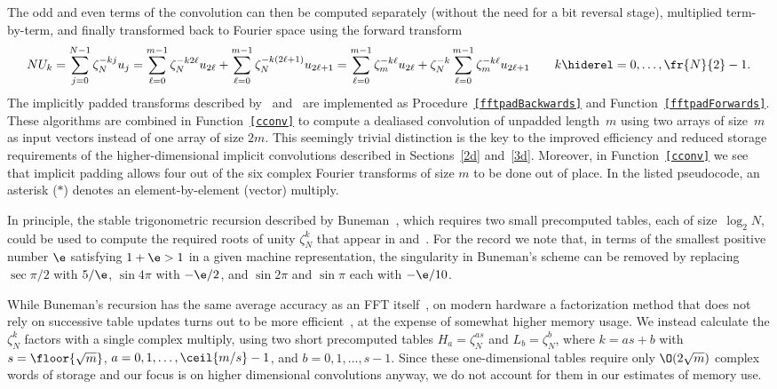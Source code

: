 \documentclass[final]{siamltex}
\def\bel{\begin{dmath}}
\def\eel{\end{dmath}}
\def\no{\hiderel}
\begin{document}
The odd and even terms of the convolution can then be computed separately
(without the need for a bit reversal stage), multiplied term-by-term, and
finally transformed back to Fourier space using the forward transform
\bel
NU_k=\sum_{j=0}^{N-1}\zeta_N^{-kj} u_j
=\sum_{\ell=0}^{m-1}\zeta_N^{-k2\ell} u_{2\ell}
+\sum_{\ell=0}^{m-1}\zeta_N^{-k(2\ell+1)} u_{2\ell+1}
=\sum_{\ell=0}^{m-1}\zeta_m^{-k\ell} u_{2\ell}
+\zeta_N^{-k}\sum_{\ell=0}^{m-1}\zeta_m^{-k\ell} u_{2\ell+1}
\qquad k\no=0,\ldots,\fr{N}{2}-1.\label{cconv1forwards}
\eel
The implicitly padded transforms described by~
and~ are implemented as
Procedure~{\tt\ref{fftpadBackwards}} and Function~{\tt\ref{fftpadForwards}}.
These algorithms are combined in Function~{\tt\ref{cconv}} to 
compute a dealiased convolution of unpadded length~$m$ using
two arrays of size~$m$ as input vectors instead of one array of size $2m$.
This seemingly trivial distinction is the key to the improved efficiency
and reduced storage requirements of the higher-dimensional implicit
convolutions described in Sections~\ref{2d} and~\ref{3d}.
Moreover, in Function~{\tt\ref{cconv}} we see that implicit padding allows four
out of the six complex Fourier transforms of size $m$ to be done out of place.
In the listed pseudocode, an asterisk ($*$) denotes an element-by-element
(vector) multiply.

In principle, the stable trigonometric recursion described by
Buneman~\cite{Buneman87}, which requires two small precomputed tables, each
of size~$\log_2 N$, could be used to compute the required roots of unity
$\zeta_N^k$ that appear in 
and~. For the
record we note that, in terms of the smallest positive number $\e$ 
satisfying $1+\e > 1$ in a given machine representation, the singularity in
Buneman's scheme can be removed by replacing $\sec{\pi/2}$ with  $5/\e$,
$\sin 4\pi$ with $-\e/2$, and $\sin{2\pi}$ and $\sin{\pi}$ each with $-\e/10$.

While Buneman's recursion has the same average accuracy as an FFT
itself~\cite{Tasche02}, on modern hardware a factorization method that does
not rely on successive table updates turns out to be more
efficient~\cite{Johnson09}, at the expense of somewhat higher memory usage.
We instead calculate the $\zeta_N^k$ factors with a single complex
multiply, using two short precomputed tables $H_a=\zeta_N^{as}$ and
$L_b=\zeta_N^b$, where $k=as+b$ with $s=\floor{\sqrt m}$,
$a=0,1,\ldots,\ceil{m/s}-1$, and $b=0,1,\ldots,s-1$. Since these
one-dimensional tables require only $\O(2\sqrt{m})$ complex words of
storage and our focus is on higher dimensional convolutions anyway, we do
not account for them in our estimates of memory use. 
\end{document}
